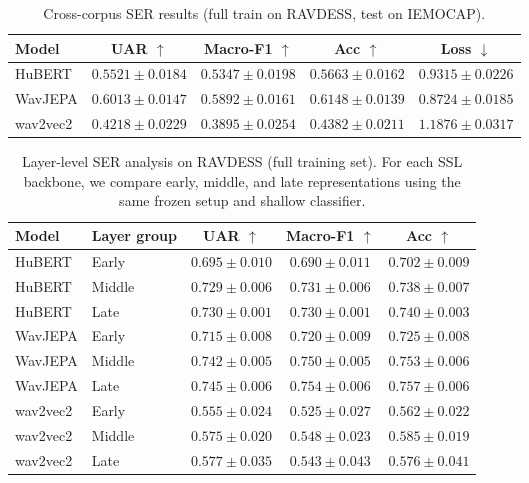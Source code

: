 \documentclass[11pt]{article}
\begin{document}
\begin{table}[H]
\centering
\caption{Cross-corpus SER results (full train on RAVDESS, test on IEMOCAP).}
\label{tab:ser_iemocap_results}
\begin{tabular}{lcccc}
\toprule
\textbf{Model} & \textbf{UAR $\uparrow$} & \textbf{Macro-F1 $\uparrow$} & \textbf{Acc $\uparrow$} & \textbf{Loss $\downarrow$} \\
\midrule
HuBERT   & $0.5521 \pm 0.0184$ & $0.5347 \pm 0.0198$ & $0.5663 \pm 0.0162$ & $0.9315 \pm 0.0226$ \\
WavJEPA  & $\mathbf{0.6013 \pm 0.0147}$ & $\mathbf{0.5892 \pm 0.0161}$ & $\mathbf{0.6148 \pm 0.0139}$ & $\mathbf{0.8724 \pm 0.0185}$ \\
wav2vec2 & $0.4218 \pm 0.0229$ & $0.3895 \pm 0.0254$ & $0.4382 \pm 0.0211$ & $1.1876 \pm 0.0317$ \\
\bottomrule
\end{tabular}
\end{table}

\begin{table}[H]
\centering
\caption{Layer-level SER analysis on RAVDESS (full training set). For each SSL backbone, we compare early, middle, and late representations using the same frozen setup and shallow classifier.}
\label{tab:ser_layer_results}
\begin{tabular}{llccc}
\toprule
\textbf{Model} & \textbf{Layer group} & \textbf{UAR $\uparrow$} & \textbf{Macro-F1 $\uparrow$} & \textbf{Acc $\uparrow$} \\
\midrule
HuBERT   & Early  & $0.695 \pm 0.010$ & $0.690 \pm 0.011$ & $0.702 \pm 0.009$ \\
HuBERT   & Middle & $\mathbf{0.729 \pm 0.006}$ & $\mathbf{0.731 \pm 0.006}$ & $\mathbf{0.738 \pm 0.007}$ \\
HuBERT   & Late   & $0.730 \pm 0.001$ & $0.730 \pm 0.001$ & $0.740 \pm 0.003$ \\
\midrule
WavJEPA  & Early  & $0.715 \pm 0.008$ & $0.720 \pm 0.009$ & $0.725 \pm 0.008$ \\
WavJEPA  & Middle & $\mathbf{0.742 \pm 0.005}$ & $\mathbf{0.750 \pm 0.005}$ & $\mathbf{0.753 \pm 0.006}$ \\
WavJEPA  & Late   & $0.745 \pm 0.006$ & $0.754 \pm 0.006$ & $0.757 \pm 0.006$ \\
\midrule
wav2vec2 & Early  & $0.555 \pm 0.024$ & $0.525 \pm 0.027$ & $0.562 \pm 0.022$ \\
wav2vec2 & Middle & $\mathbf{0.575 \pm 0.020}$ & $\mathbf{0.548 \pm 0.023}$ & $\mathbf{0.585 \pm 0.019}$ \\
wav2vec2 & Late   & $0.577 \pm 0.035$ & $0.543 \pm 0.043$ & $0.576 \pm 0.041$ \\
\bottomrule
\end{tabular}
\end{table}
\end{document}
